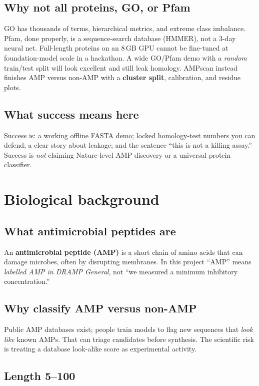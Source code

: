 \documentclass[11pt,a4paper]{report}
\begin{document}
\section{Why not all proteins, GO, or Pfam}

GO has thousands of terms, hierarchical metrics, and extreme class imbalance. Pfam, done properly, is a sequence-search database (HMMER), not a 3-day neural net. Full-length proteins on an 8\,GB GPU cannot be fine-tuned at foundation-model scale in a hackathon. A wide GO/Pfam demo with a \emph{random} train/test split will look excellent and still leak homology. AMPscan instead finishes AMP versus non-AMP with a \textbf{cluster split}, calibration, and residue plots.

\section{What success means here}

Success is: a working offline FASTA demo; locked homology-test numbers you can defend; a clear story about leakage; and the sentence ``this is not a killing assay.'' Success is \emph{not} claiming Nature-level AMP discovery or a universal protein classifier.

\chapter{Biological background}
\label{ch:bio}

\section{What antimicrobial peptides are}

An \textbf{antimicrobial peptide (AMP)} is a short chain of amino acids that can damage microbes, often by disrupting membranes. In this project ``AMP'' means \emph{labelled AMP in DRAMP General}, not ``we measured a minimum inhibitory concentration.''

\section{Why classify AMP versus non-AMP}

Public AMP databases exist; people train models to flag new sequences that \emph{look like} known AMPs. That can triage candidates before synthesis. The scientific risk is treating a database look-alike score as experimental activity.

\section{Length 5--100}
\end{document}
